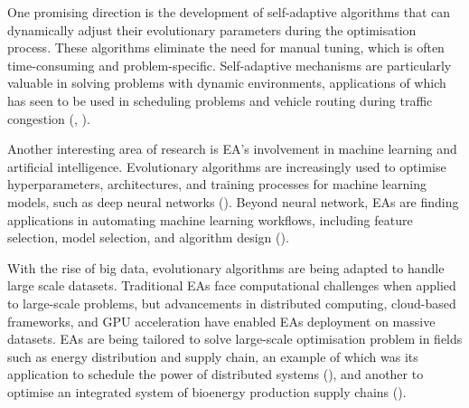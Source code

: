\parbreak\noindent One promising direction is the development of self-adaptive algorithms that can dynamically adjust their evolutionary parameters during the optimisation process. These algorithms eliminate the need for manual tuning, which is often time-consuming and problem-specific. Self-adaptive mechanisms are particularly valuable in solving problems with dynamic environments, applications of which has seen to be used in scheduling problems and vehicle routing during traffic congestion (\cite{dulebenets2018self}, \cite{sabar2019self}).

\parbreak\noindent Another interesting area of research is EA's involvement in machine learning and artificial intelligence. Evolutionary algorithms are increasingly used to optimise hyperparameters, architectures, and training processes for machine learning models, such as deep neural networks (\cite{young2015optimizing}). Beyond neural network, EAs are finding applications in automating machine learning workflows, including feature selection, model selection, and algorithm design (\cite{nikitin2022automated}).

\parbreak\noindent With the rise of big data, evolutionary algorithms are being adapted to handle large scale datasets. Traditional EAs face computational challenges when applied to large-scale problems, but advancements in distributed computing, cloud-based frameworks, and GPU acceleration have enabled EAs deployment on massive datasets. EAs are being tailored to solve large-scale optimisation problem in fields such as energy distribution and supply chain, an example of which was its application to schedule the power of distributed systems (\cite{guzek2014multi}), and another to optimise an integrated system of bioenergy production supply chains (\cite{ayoub2009evolutionary}).

